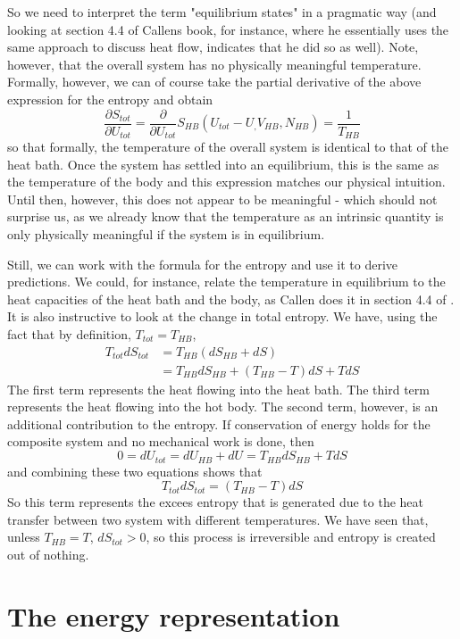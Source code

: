 \documentclass[a4paper, draft]{report}
\numberwithin{section}{chapter}
\numberwithin{equation}{chapter}
\theoremstyle{own}
\theoremstyle{remark}
\begin{document}
So we need to interpret the term "equilibrium states" in a pragmatic way (and looking at section 4.4 of Callens book, for instance, where he essentially uses the same approach to discuss heat flow, indicates that he did so as well). Note, however, that the overall system has no physically meaningful temperature. Formally, however, we can of course take the partial derivative of the above expression for the entropy and obtain
$$
\frac{\partial S_{tot}}{\partial U_{tot}} = \frac{\partial}{\partial U_{tot}} S_{HB}(U_{tot} - U_, V_{HB}, N_{HB}) = \frac{1}{T_{HB}}
$$
so that formally, the temperature of the overall system is identical to that of the heat bath. Once the system has settled into an equilibrium, this is the same as the temperature of the body and this expression matches our physical intuition. Until then, however, this does not appear to be meaningful - which should not surprise us, as we already know that the temperature as an intrinsic quantity is only physically meaningful if the system is in equilibrium.

Still, we can work with the formula for the entropy and use it to derive predictions. We could, for instance, relate the temperature in equilibrium to the heat capacities of the heat bath and the body, as Callen does it in section 4.4 of \cite{Callen}. It is also instructive to look at the change in total entropy. We have, using the fact that by definition, $T_{tot} = T_{HB}$, 
\begin{align*}
T_{tot} dS_{tot} &= T_{HB} (dS_{HB} + dS)  \\
&= T_{HB} dS_{HB} + (T_{HB} - T) dS + T dS
\end{align*}
The first term represents the heat flowing into the heat bath. The third term represents the heat flowing into the hot body. The second term, however, is an additional contribution to the entropy. If conservation of energy holds for the composite system and no mechanical work is done, then
$$
0 = dU_{tot} = dU_{HB} + dU = T_{HB} dS_{HB}  + T dS
$$
and combining these two equations shows that
$$
T_{tot} dS_{tot} = (T_{HB} - T) dS
$$
So this term represents the excees entropy that is generated due to the heat transfer between two system with different temperatures. We have seen that, unless $T_{HB} = T$, $dS_{tot} > 0$, so this process is irreversible and entropy is created out of nothing.


\section{The energy representation}
\end{document}
